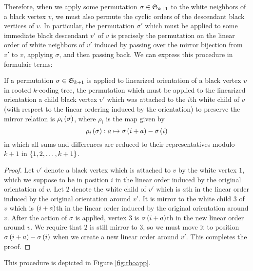 \documentclass[distribution,draft]{brandiss} %
\numberwithin{section}{chapter}
\numberwithin{figure}{chapter}
\begin{document}
Therefore, when we apply some permutation $\sigma \in  \mathfrak{S}_{k+1} $ to the white neighbors of a black vertex $v$, we must also permute the cyclic orders of the descendant black vertices of $v$.
In particular, the permutation $\sigma'$ which must be applied to some immediate black descendant $v'$ of $v$ is precisely the permutation on the linear order of white neighbors of $v'$ induced by passing over the mirror bijection from $v'$ to $v$, applying $\sigma$, and then passing back.
We can express this procedure in formulaic terms:
\begin{theorem}
  \label{thm:rhodef}
  If a permutation $\sigma \in  \mathfrak{S}_{k+1} $ is applied to linearized orientation of a black vertex $v$ in rooted $k$-coding tree, the permutation which must be applied to the linearized orientation a child black vertex $v'$ which was attached to the $i$th white child of $v$ (with respect to the linear ordering induced by the orientation) to preserve the mirror relation is $\rho_{i} \left( {\sigma} \right)$, where $\rho_{i}$ is the map given by
  \begin{equation}
    \label{eq:rhodef}
    \rho_{i} \left( {\sigma} \right): a \mapsto \sigma \left( {i + a} \right) - \sigma \left( {i} \right)
  \end{equation}
  in which all sums and differences are reduced to their representatives modulo $k+1$ in $\left\{ {1, 2, \dots, k+1} \right\}$.
\end{theorem}
\begin{proof}
  Let $v'$ denote a black vertex which is attached to $v$ by the white vertex $1$, which we suppose to be in position $i$ in the linear order induced by the original orientation of $v$.
  Let $2$ denote the white child of $v'$ which is $a$th in the linear order induced by the original orientation around $v'$.
  It is mirror to the white child $3$ of $v$ which is $\left( {i+a} \right)$th in the linear order induced by the original orientation around $v$.
  After the action of $\sigma$ is applied, vertex $3$ is $\sigma \left( {i+a} \right)$th in the new linear order around $v$.
  We require that $2$ is still mirror to $3$, so we must move it to position $\sigma \left( {i + a} \right) - \sigma \left( {i} \right)$ when we create a new linear order around $v'$.
  This completes the proof.
\end{proof}
This procedure is depicted in Figure \ref{fig:rhoapp}.
\end{document}
